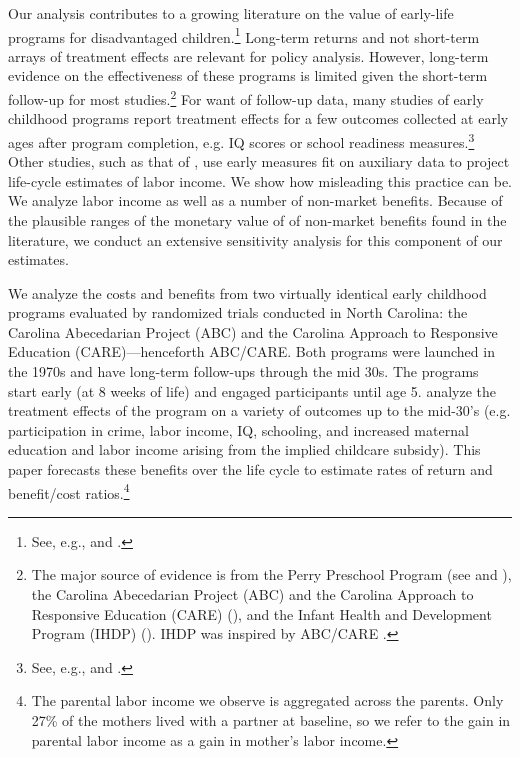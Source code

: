 Our analysis contributes to a growing literature on the value of early-life programs for disadvantaged children.\footnote{See, e.g., \cite{Currie_2011_AER} and \cite{Elango_Hojman_etal_2016_Early-Edu}.} Long-term returns and not short-term arrays of treatment effects are relevant for policy analysis. However, long-term evidence on the effectiveness of these programs is limited given the short-term follow-up for most studies.\footnote{The major source of evidence is from the Perry Preschool Program (see \citealp{Schweinhart_Montie_ea_2005_BOOKlifetime} and \citealp{Heckman_Moon_etal_2010_QE,Heckman_Moon_etal_2010_RateofReturn}), the Carolina Abecedarian Project (ABC) and the Carolina Approach to Responsive Education (CARE) (\citealp{Ramey_Campbell_etal_2000_ADS,Ramey-etal_2012-ABC}), and the Infant Health and Development Program (IHDP) (\citealp{Gross_Spiker_etal_1997_BOOKHelpinglowbirth,Duncan_Sojourner_2013_JHR}). IHDP was inspired by ABC/CARE \citep[][]{Gross_Spiker_etal_1997_BOOKHelpinglowbirth}.} For want of follow-up data, many studies of early childhood programs report treatment effects for a few outcomes collected at early ages after program completion, e.g. IQ scores or school readiness measures.\footnote{See, e.g.,  \cite{Weiland_2013_CD_Impacts-of-Pre-K} and \cite{Kline_Walters_2016_QJE}.} Other studies, such as that of \citet{Kline_Walters_2016_QJE}, use early measures fit on auxiliary data to project life-cycle estimates of labor income. We show how misleading this practice can be. We analyze labor income as well as a number of non-market benefits. Because of the plausible ranges of the monetary value of of non-market benefits found in the literature, we conduct an extensive sensitivity analysis for this component of our estimates.

We analyze the costs and benefits from two virtually identical early childhood programs evaluated by randomized trials conducted in North Carolina: the Carolina Abecedarian Project (ABC) and the Carolina Approach to Responsive Education (CARE)---henceforth ABC/CARE. Both programs were launched in the 1970s and have long-term follow-ups through the mid 30s. The programs start early (at 8 weeks of life) and engaged participants until age 5. \cite{Garcia_Heckman_Ziff_2017_Gender-Diff_UNPUBLISHED} analyze the treatment effects of the program on a variety of outcomes up to the mid-30's (e.g. participation in crime, labor income, IQ, schooling, and increased maternal education and labor income arising from the implied childcare subsidy). This paper forecasts these benefits over the life cycle to estimate rates of return and benefit/cost ratios.\footnote{The parental labor income we observe is aggregated across the parents. Only 27\% of the mothers lived with a partner at baseline, so we refer to the gain in parental labor income as a gain in mother's labor income.}


